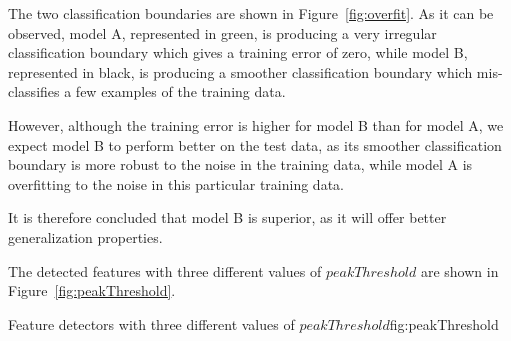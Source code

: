 \documentclass{article}
\begin{document}
\clearpage

The two classification boundaries are shown in Figure~\ref{fig:overfit}. As it can be observed, model A, represented in green, is producing a very irregular classification boundary which gives a training error of zero, while model B, represented in black, is producing a smoother classification boundary which mis-classifies a few examples of the training data.

However, although the training error is higher for model B than for model A, we expect model B to perform better on the test data, as its smoother classification boundary is more robust to the noise in the training data, while model A is overfitting to the noise in this particular training data.

It is therefore concluded that model B is superior, as it will offer better generalization properties.



The detected features with three different values of $peakThreshold$ are shown in Figure~\ref{fig:peakThreshold}. %

{}
{}
{Feature detectors with three different values of $peakThreshold$}{fig:peakThreshold}
\end{document}
